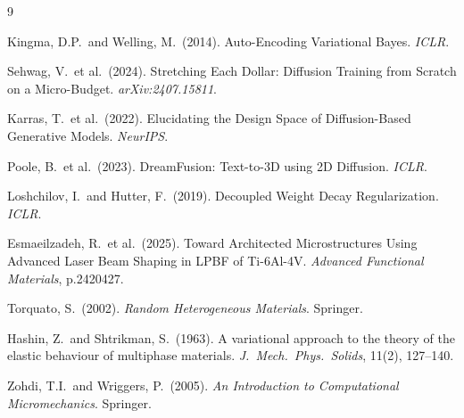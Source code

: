 \documentclass[12pt,a4paper]{article}
\theoremstyle{definition}
\begin{document}

\begin{thebibliography}{9}

  Kingma, D.P.\ and Welling, M.\ (2014).
  Auto-Encoding Variational Bayes.
  \emph{ICLR}.

  Sehwag, V.\ et al.\ (2024).
  Stretching Each Dollar: Diffusion Training from Scratch on a Micro-Budget.
  \emph{arXiv:2407.15811}.

  Karras, T.\ et al.\ (2022).
  Elucidating the Design Space of Diffusion-Based Generative Models.
  \emph{NeurIPS}.

  Poole, B.\ et al.\ (2023).
  DreamFusion: Text-to-3D using 2D Diffusion.
  \emph{ICLR}.

  Loshchilov, I.\ and Hutter, F.\ (2019).
  Decoupled Weight Decay Regularization.
  \emph{ICLR}.

  Esmaeilzadeh, R.\ et al.\ (2025).
  Toward Architected Microstructures Using Advanced Laser Beam Shaping
  in LPBF of Ti-6Al-4V.
  \emph{Advanced Functional Materials}, p.2420427.

  Torquato, S.\ (2002).
  \emph{Random Heterogeneous Materials}.
  Springer.

  Hashin, Z.\ and Shtrikman, S.\ (1963).
  A variational approach to the theory of the elastic behaviour of
  multiphase materials.
  \emph{J.\ Mech.\ Phys.\ Solids}, 11(2), 127--140.

  Zohdi, T.I.\ and Wriggers, P.\ (2005).
  \emph{An Introduction to Computational Micromechanics}.
  Springer.

\end{thebibliography}
\end{document}
